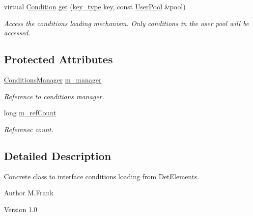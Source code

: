 \begin{DoxyCompactItemize}
virtual \hyperlink{class_d_d4hep_1_1_conditions_1_1_condition}{Condition} \hyperlink{class_d_d4hep_1_1_conditions_1_1_conditions_loader_imp_a742f7d5a8d3d0666ee64baa3502982ce}{get} (\hyperlink{class_d_d4hep_1_1_conditions_1_1_conditions_loader_ac77fe60ee60373d61aed19b200949c93}{key\_\-type} key, const \hyperlink{class_d_d4hep_1_1_conditions_1_1_user_pool}{UserPool} \&pool)
\begin{DoxyCompactList}\small\item\em Access the conditions loading mechanism. Only conditions in the user pool will be accessed. \item\end{DoxyCompactList}\end{DoxyCompactItemize}
\subsection*{Protected Attributes}
\begin{DoxyCompactItemize}
\item 
\hyperlink{class_d_d4hep_1_1_conditions_1_1_conditions_manager}{ConditionsManager} \hyperlink{class_d_d4hep_1_1_conditions_1_1_conditions_loader_imp_ab6ca31cc5ee9e155af821c6c755d60c6}{m\_\-manager}
\begin{DoxyCompactList}\small\item\em Reference to conditions manager. \item\end{DoxyCompactList}\item 
long \hyperlink{class_d_d4hep_1_1_conditions_1_1_conditions_loader_imp_aa108f7ae2788453c48cd29ad11596c76}{m\_\-refCount}
\begin{DoxyCompactList}\small\item\em Referenec count. \item\end{DoxyCompactList}\end{DoxyCompactItemize}


\subsection{Detailed Description}
Concrete class to interface conditions loading from DetElements. \begin{DoxyAuthor}{Author}
M.Frank 
\end{DoxyAuthor}
\begin{DoxyVersion}{Version}
1.0 
\end{DoxyVersion}


